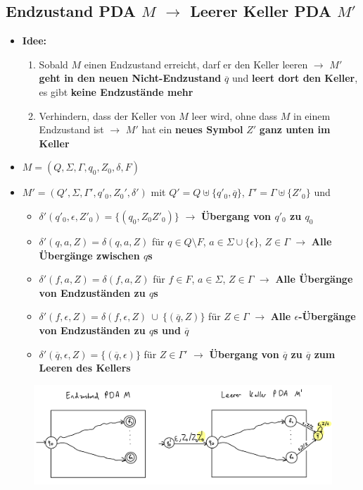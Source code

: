 \documentclass[ieeetran]{article}
\begin{document}
\subsection{Endzustand PDA $M$ $\rightarrow$ Leerer Keller PDA $M'$} %
\label{sub:endzustand_pDA_rightarrow_leerer_keller_pDA}
\begin{itemize}
	\item \textbf{Idee:}
		\begin{enumerate}
			\item Sobald $M$ einen Endzustand erreicht, darf er den Keller leeren $\rightarrow$ $M'$ \textbf{geht in den neuen Nicht-Endzustand} $\overline{q}$ und \textbf{leert dort den Keller}, es gibt \textbf{keine Endzustände mehr}
			\item Verhindern, dass der Keller von $M$ leer wird, ohne dass $M$ in einem Endzustand ist $\rightarrow$ $M'$ hat ein \textbf{neues Symbol} $Z'$ \textbf{ganz unten im Keller} 
		\end{enumerate}
\item $M = (Q, \Sigma, \Gamma, q_0, Z_0, \delta, F)$
\item $M' = (Q', \Sigma, \Gamma', q'_0, Z_0', \delta')$ mit $Q' = Q \uplus \{q'_0, \overline{q}\}$, $\Gamma' = \Gamma \uplus \{Z'_0\}$ und
\begin{itemize}
  
\item $\delta'(q'_0, \epsilon, Z'_0) = \{(q_0, Z_0Z'_0)\}$ $\rightarrow$ \textbf{Übergang von $q'_0$ zu $q_0$}
\item $\delta'(q, a, Z) = \delta(q, a, Z)$ für $q \in Q \setminus F$, $a \in \Sigma \cup \{\epsilon\}$, $Z \in \Gamma$ $\rightarrow$ \textbf{Alle Übergänge zwischen $q$s}
\item $\delta'(f, a, Z) = \delta(f,a,Z)$ für $f \in F$, $a \in \Sigma$, $Z \in \Gamma$ $\rightarrow$ \textbf{Alle Übergänge von Endzuständen zu $q$s}
\item $\delta'(f, \epsilon, Z) = \delta(f, \epsilon, Z) \ \cup \ \{(\overline{q}, Z)\}$ für $Z \in \Gamma$ $\rightarrow$ \textbf{Alle $\epsilon$-Übergänge von Endzuständen zu $q$s und $\overline{q}$}
\item $\delta'(\overline{q}, \epsilon, Z) = \{(\overline{q}, \epsilon)\}$ für $Z \in \Gamma'$ $\rightarrow$ \textbf{Übergang von $\overline{q}$ zu $\overline{q}$ zum Leeren des Kellers}
\end{itemize}

\end{itemize}
\begin{figure}[h!]
  \centering
  \includegraphics[width=0.52\linewidth]{endtoleerpda.jpg}
  \label{fig:endtoleerpda_jpg}
\end{figure}
\end{document}

